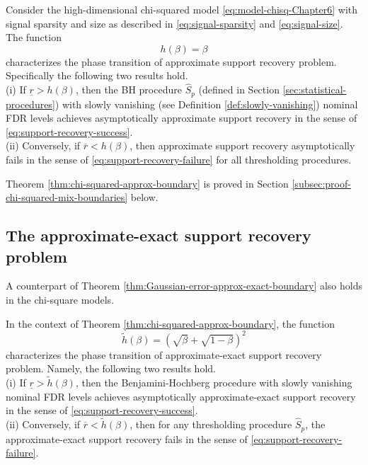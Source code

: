 \begin{theorem} \label{thm:chi-squared-approx-boundary}
Consider the high-dimensional chi-squared model \eqref{eq:model-chisq-Chapter6} with signal sparsity and size as described in \eqref{eq:signal-sparsity} and \eqref{eq:signal-size}.
The function 
\begin{equation} \label{eq:approx-boundary-chisquared}
    h(\beta) = \beta
\end{equation}
characterizes the phase transition of approximate support recovery problem. Specifically the following two results hold.\\

{\rm (i)} If $\underline{r} > {h}(\beta)$, then the \ac{BH} procedure $\widehat{S}_p$ (defined in Section \ref{sec:statistical-procedures}) with slowly vanishing (see Definition \ref{def:slowly-vanishing}) nominal FDR levels achieves asymptotically approximate support recovery in the sense of \eqref{eq:support-recovery-success}. \\

{\rm (ii)} Conversely, if $\overline{r} < {h}(\beta)$, then approximate support recovery asymptotically fails in the sense of \eqref{eq:support-recovery-failure} for all thresholding procedures.
\end{theorem}

Theorem \ref{thm:chi-squared-approx-boundary} is proved in Section \ref{subsec:proof-chi-squared-mix-boundaries} below. 


\subsection{The approximate-exact support recovery problem}
\label{subsec:aprox-exact-support-recovery-chisq}

A counterpart of Theorem \ref{thm:Gaussian-error-approx-exact-boundary} also holds in the chi-square models.

\begin{theorem} \label{thm:chi-squared-approx-exact-boundary}
In the context of Theorem \ref{thm:chi-squared-approx-boundary}, the function 
\begin{equation} \label{eq:approx-exact-boundary-chisquared}
    \widetilde{h}(\beta) = \left(\sqrt{\beta} + \sqrt{1-\beta}\right)^2
\end{equation}
characterizes the phase transition of approximate-exact support recovery problem. Namely, 
the following two results hold.\\

{\rm (i)} If $\underline{r} > \widetilde{h}(\beta)$, then the Benjamini-Hochberg procedure with slowly vanishing nominal FDR levels achieves asymptotically approximate-exact support recovery in the sense of \eqref{eq:support-recovery-success}. \\

{\rm (ii)} Conversely, if $\overline{r} < \widetilde{h}(\beta)$, then for any thresholding procedure $\widehat{S}_p$, the approximate-exact support recovery fails in the sense of \eqref{eq:support-recovery-failure}.
\end{theorem}

